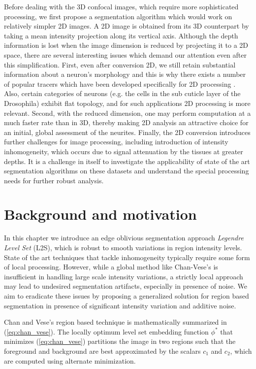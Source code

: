 Before dealing with the 3D confocal images, which require more sophisticated processing, we first propose a segmentation algorithm which would work on relatively simpler 2D images. A 2D image is obtained from its 3D counterpart by taking a mean intensity projection along its vertical axis. Although the depth information is lost  when the image dimension is reduced by projecting it to a 2D space, there are several interesting issues which demand our attention even after this simplification. First, even after conversion  2D, we still retain substantial information about a neuron's morphology and this is why there exists a number of popular tracers which have been developed specifically for 2D processing \cite{basu2010tree2tree,meijering2004design}. Also, certain categories of neurons (e.g. the cells in the sub cuticle layer of  the Drosophila) exhibit flat topology, and for such applications 2D processing is more relevant.
Second, with the reduced dimension, one may perform computation at a much faster rate than in 3D, thereby making 2D analysis an attractive choice for an initial, global assessment of the neurites.  Finally, the 2D conversion introduces further challenges for image processing, including introduction of intensity inhomogeneity, which occurs due to signal attenuation by the tissues at greater depths. It is a challenge in itself to investigate the applicability of state of the art segmentation algorithms on these datasets and understand the special processing needs for further robust analysis.

\section{Background and motivation}
In this chapter we introduce an edge oblivious segmentation approach \emph{Legendre Level Set} (L2S), which is robust to smooth variations in region intensity levels. State of the art techniques that tackle inhomogeneity typically require some form of local processing. However, while a global method like Chan-Vese's is insufficient in handling large scale intensity variations, a strictly local approach may lead to undesired segmentation artifacts, especially in presence of noise. We aim to eradicate these issues by proposing a generalized solution for region based segmentation in presence of significant intensity variation and additive noise. 

Chan and Vese's region based technique is mathematically summarized in (\ref{eq:chan_vese}). The locally optimum level set embedding function $\phi^*$ that minimizes (\ref{eq:chan_vese}) partitions the image in two regions such that the foreground and background are best approximated by the scalars $c_1$ and $c_2$, which are computed using alternate minimization.


